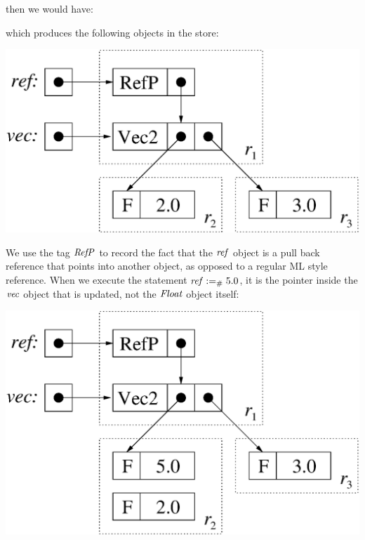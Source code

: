 
then we would have:


which produces the following objects in the store:

\begin{center}
\includegraphics[scale=0.5]{2-System/fig/projections/pull-back}
\end{center}

We use the tag $\operatorname{\mathit{RefP}}$ to record the fact that the $\operatorname{\mathit{ref}}$ object is a pull back reference that points into another object, as opposed to a regular ML style reference. When we execute the statement $\operatorname{\mathit{ref}} :=_{\#} 5.0$, it is the pointer inside the $\operatorname{\mathit{vec}}$ object that is updated, not the $\operatorname{\mathit{Float}}$ object itself:

\begin{center}
\includegraphics[scale=0.5]{2-System/fig/projections/pull-back-update}
\end{center}


